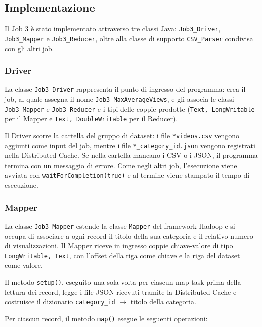 \documentclass[12pt, a4paper]{article}
\begin{document}
\subsection{Implementazione}

Il Job 3 è stato implementato attraverso tre classi Java:
\texttt{Job3\_Driver}, \texttt{Job3\_Mapper} e
\texttt{Job3\_Reducer}, oltre alla classe di supporto
\texttt{CSV\_Parser} condivisa con gli altri job.

\subsubsection{Driver}

La classe \texttt{Job3\_Driver} rappresenta il punto
di ingresso del programma: crea il job, al quale
assegna il nome \texttt{Job3\_MaxAverageViews}, e gli associa
le classi \texttt{Job3\_Mapper} e \texttt{Job3\_Reducer}
e i tipi delle coppie prodotte (\texttt{Text, LongWritable}
per il Mapper e \texttt{Text, DoubleWritable} per il Reducer).

Il Driver scorre la cartella del gruppo di dataset:
i file \texttt{*videos.csv} vengono aggiunti come input
del job, mentre i file \texttt{*\_category\_id.json}
vengono registrati nella Distributed Cache.
Se nella cartella mancano i CSV o i JSON, il programma
termina con un messaggio di errore.
Come negli altri job, l'esecuzione viene avviata con
\texttt{waitForCompletion(true)} e al termine
viene stampato il tempo di esecuzione.

\subsubsection{Mapper}

La classe \texttt{Job3\_Mapper} estende la classe
\texttt{Mapper} del framework Hadoop e si occupa
di associare a ogni record il titolo della sua categoria
e il relativo numero di visualizzazioni.
Il Mapper riceve in ingresso coppie chiave-valore
di tipo \texttt{LongWritable, Text}, con l'offset della riga
come chiave e la riga del dataset come valore.

Il metodo \texttt{setup()}, eseguito una sola volta
per ciascun map task prima della lettura dei record,
legge i file JSON ricevuti tramite la Distributed Cache
e costruisce il dizionario \texttt{category\_id} $\rightarrow$
titolo della categoria.

Per ciascun record, il metodo \texttt{map()} esegue
le seguenti operazioni:
\end{document}
